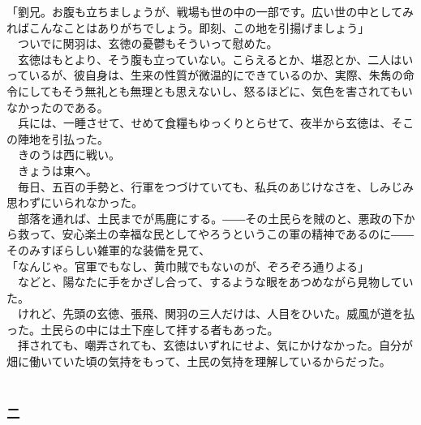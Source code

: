 \documentclass[
  paper=a5,
  fontsize=10pt,
  jafontsize=9.5pt,
  tate,                  %
  open_bracket_pos=nibu, %
]{jlreq}
\begin{document}
「劉兄。お腹も立ちましょうが、戦場も世の中の一部です。広い世の中としてみればこんなことはありがちでしょう。即刻、この地を引揚げましょう」\\


　ついでに関羽は、玄徳の憂鬱もそういって慰めた。\\


　玄徳はもとより、そう腹も立っていない。こらえるとか、堪忍とか、二人はいっているが、彼自身は、生来の性質が微温的にできているのか、実際、朱雋の命令にしてもそう無礼とも無理とも思えないし、怒るほどに、気色を害されてもいなかったのである。\\


　兵には、一睡させて、せめて食糧もゆっくりとらせて、夜半から玄徳は、そこの陣地を引払った。\\


　きのうは西に戦い。\\


　きょうは東へ。\\


　毎日、五百の手勢と、行軍をつづけていても、私兵のあじけなさを、しみじみ思わずにいられなかった。\\


　部落を通れば、土民までが馬鹿にする。――その土民らを賊のと、悪政の下から救って、安心楽土の幸福な民としてやろうというこの軍の精神であるのに――そのみすぼらしい雑軍的な装備を見て、\\


「なんじゃ。官軍でもなし、黄巾賊でもないのが、ぞろぞろ通りよる」\\


　などと、陽なたに手をかざし合って、するような眼をあつめながら見物していた。\\


　けれど、先頭の玄徳、張飛、関羽の三人だけは、人目をひいた。威風が道を払った。土民らの中には土下座して拝する者もあった。\\


　拝されても、嘲弄されても、玄徳はいずれにせよ、気にかけなかった。自分が畑に働いていた頃の気持をもって、土民の気持を理解しているからだった。\\

\\

\subsubsection{二}

\\
\end{document}

